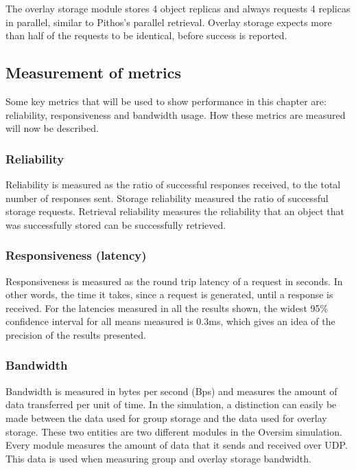 The overlay storage module stores 4 object replicas and always requests 4 replicas in parallel, similar to Pithos's parallel retrieval. Overlay storage expects more than half of the requests to be identical, before success is reported.

\subsection{Measurement of metrics}
\label{metric_measurement}

Some key metrics that will be used to show performance in this chapter are: reliability, responsiveness and bandwidth usage. How these metrics are measured will now be described.

\subsubsection{Reliability}
Reliability is measured as the ratio of successful responses received, to the total number of responses sent. Storage reliability measured the ratio of successful storage requests. Retrieval reliability measures the reliability that an object that was successfully stored can be successfully retrieved.

\subsubsection{Responsiveness (latency)}

Responsiveness is measured as the round trip latency of a request in seconds.  In other words, the time it takes, since a request is generated, until a response is received. For the latencies measured in all the results shown, the widest 95\% confidence interval for all means measured is 0.3ms, which gives an idea of the precision of the results presented.

\subsubsection{Bandwidth}

Bandwidth is measured in bytes per second (Bps) and measures the amount of data transferred per unit of time. In the simulation, a distinction can easily be made between the data used for group storage and the data used for overlay storage. These two entities are two different modules in the Oversim simulation. Every module measures the amount of data that it sends and received over UDP. This data is used when measuring group and overlay storage bandwidth.

